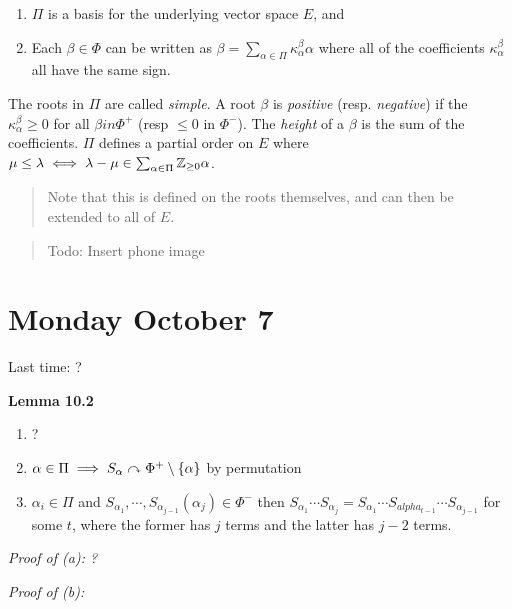 \begin{enumerate}
\def\labelenumi{\arabic{enumi}.}
\tightlist
\item
  \(\Pi\) is a basis for the underlying vector space \(E\), and
\item
  Each \(\beta \in \Phi\) can be written as
  \(\beta = \sum_{\alpha\in\Pi} \kappa_\alpha^\beta \alpha\) where all
  of the coefficients \(\kappa_\alpha^\beta\) all have the same sign.
\end{enumerate}

The roots in \(\Pi\) are called \emph{simple}. A root \(\beta\) is
\emph{positive} (resp. \emph{negative}) if the
\(\kappa_\alpha^\beta \geq 0\) for all \(\beta in \Phi^+\) (resp
\(\leq 0\) in \(\Phi^-\)). The \emph{height} of a \(\beta\) is the sum
of the coefficients. \(\Pi\) defines a partial order on \(E\) where
\(\mu \leq \lambda \iff \lambda - \mu \in \sum_{\alpha \in \Pi} {\mathbb{Z}}_{\geq 0} \alpha\).

\begin{quote}
Note that this is defined on the roots themselves, and can then be
extended to all of \(E\).
\end{quote}

\begin{quote}
Todo: Insert phone image
\end{quote}

\hypertarget{monday-october-7}{%
\section{Monday October 7}\label{monday-october-7}}

Last time: ?

\textbf{Lemma 10.2}

\begin{enumerate}
\def\labelenumi{\alph{enumi}.}
\tightlist
\item
  ?
\item
  \(\alpha \in \Pi \implies S_\alpha \curvearrowright \Phi^+\setminus\left\{{\alpha}\right\}\)
  by permutation
\item
  \(\alpha_i \in \Pi\) and
  \(S_{\alpha_1}, \cdots, S_{\alpha_{j-1}}(\alpha_j) \in \Phi^-\) then
  \(S_{\alpha_1} \cdots S_{\alpha_j} = S_{\alpha_1} \cdots S_{alpha_{t-1}} \cdots S_{\alpha_{j-1}}\)
  for some \(t\), where the former has \(j\) terms and the latter has
  \(j-2\) terms.
\end{enumerate}

\emph{Proof of (a): ?}

\emph{Proof of (b):}

